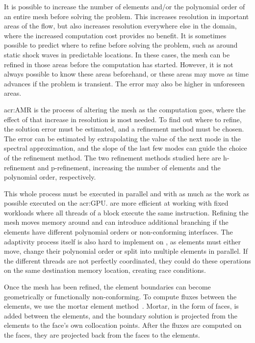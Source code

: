 It is possible to increase the number of elements and/or the polynomial order of an entire mesh
before solving the problem. This increases resolution in important areas of the flow, but also
increases resolution everywhere else in the domain, where the increased computation cost provides no
benefit. It is sometimes possible to predict where to refine before solving the problem, such as
around static shock waves in predictable locations. In these cases, the mesh can be refined in those
areas before the computation has started. However, it is not always possible to know these areas
beforehand, or these areas may move as time advances if the problem is transient. The error may also
be higher in unforeseen areas.

\Acrlong{acr:AMR} is the process of altering the mesh as the computation goes, where the effect of
that increase in resolution is most needed. To find out where to refine, the solution error must be
estimated, and a refinement method must be chosen. The error can be estimated by extrapolating the
value of the next mode in the spectral approximation, and the slope of the last few modes can guide
the choice of the refinement method. The two refinement methods studied here are h-refinement and
p-refinement, increasing the number of elements and the polynomial order, respectively.

This whole process must be executed in parallel and with as much as the work as possible executed on
the \acrshort{acr:GPU}.  are more efficient at working with fixed workloads
where all threads of a block execute the same instruction. Refining the mesh moves memory around and
can introduce additional branching if the elements have different polynomial orders or
non-conforming interfaces. The adaptivity process itself is also hard to implement on
, as elements must either move, change their polynomial order or split into
multiple elements in parallel. If the different threads are not perfectly coordinated, they could do
these operations on the same destination memory location, creating race conditions.

Once the mesh has been refined, the element boundaries can become geometrically or functionally
non-conforming. To compute fluxes between the elements, we use the mortar element
method~\cite{Maday1989}. Mortar, in the form of faces, is added between the elements, and the
boundary solution is projected from the elements to the face's own collocation points. After the
fluxes are computed on the faces, they are projected back from the faces to the elements. 

